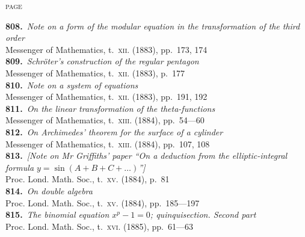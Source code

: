 \documentclass[11pt,a4paper]{article}
\providecommand{\textsc}[1]{{\scshape #1}}
\begin{document}
\clearpage

\thispagestyle{plain}
\vspace*{1em}
\hfill\textsc{page}

\small
\noindent\textbf{808.}~\textit{Note on a form of the modular equation in the transformation of the third order}~\\
\hspace*{2em}Messenger of Mathematics, t.~\textsc{xii}. (1883), pp.~173, 174\\[0.3em]
\textbf{809.}~\textit{Schr\"oter's construction of the regular pentagon}~\\
\hspace*{2em}Messenger of Mathematics, t.~\textsc{xii}. (1883), p.~177\\[0.3em]
\textbf{810.}~\textit{Note on a system of equations}~\\
\hspace*{2em}Messenger of Mathematics, t.~\textsc{xii}. (1883), pp.~191, 192\\[0.3em]
\textbf{811.}~\textit{On the linear transformation of the theta-functions}~\\
\hspace*{2em}Messenger of Mathematics, t.~\textsc{xiii}. (1884), pp.~54---60\\[0.3em]
\textbf{812.}~\textit{On Archimedes' theorem for the surface of a cylinder}~\\
\hspace*{2em}Messenger of Mathematics, t.~\textsc{xiii}. (1884), pp.~107, 108\\[0.3em]
\textbf{813.}~\textit{[Note on Mr Griffiths' paper ``On a deduction from the elliptic-integral formula $y=\sin(A+B+C+\ldots)$'']}~\\
\hspace*{2em}Proc. Lond. Math. Soc., t.~\textsc{xv}. (1884), p.~81\\[0.3em]
\textbf{814.}~\textit{On double algebra}~\\
\hspace*{2em}Proc. Lond. Math. Soc., t.~\textsc{xv}. (1884), pp.~185---197\\[0.3em]
\textbf{815.}~\textit{The binomial equation $x^{p}-1=0$; quinquisection. Second part}~\\
\hspace*{2em}Proc. Lond. Math. Soc., t.~\textsc{xvi}. (1885), pp.~61---63\\[0.3em]
\end{document}
